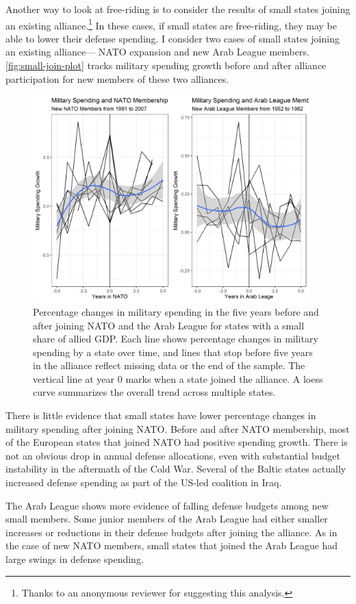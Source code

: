 \documentclass[12pt]{article}
\begin{document}
Another way to look at free-riding is to consider the results of small states joining an existing alliance.\footnote{Thanks to an anonymous reviewer for suggesting this analysis.} 
In these cases, if small states are free-riding, they may be able to lower their defense spending. 
I consider two cases of small states joining an existing alliance--- NATO expansion and new Arab League members. 
\autoref{fig:small-join-plot} tracks military spending growth before and after alliance participation for new members of these two alliances. 

\begin{figure}[htbp]
	\centering
		\includegraphics[width=0.95\textwidth]{small-join-plot.png}
	\caption{Percentage changes in military spending in the five years before and after joining NATO and the Arab League for states with a small share of allied GDP. Each line shows percentage changes in military spending by a state over time, and lines that stop before five years in the alliance reflect missing data or the end of the sample. The vertical line at year 0 marks when a state joined the alliance. A loess curve summarizes the overall trend across multiple states.}
	\label{fig:small-join-plot}
\end{figure}


There is little evidence that small states have lower percentage changes in military spending after joining NATO. 
Before and after NATO membership, most of the European states that joined NATO had positive spending growth. 
There is not an obvious drop in annual defense allocations, even with substantial budget instability in the aftermath of the Cold War.  
Several of the Baltic states actually increased defense spending as part of the US-led coalition in Iraq. 


The Arab League shows more evidence of falling defense budgets among new small members. 
Some junior members of the Arab League had either smaller increases or reductions in their defense budgets after joining the alliance. 
As in the case of new NATO members, small states that joined the Arab League had large swings in defense spending. 

\newpage
\singlespace


 
\end{document}
